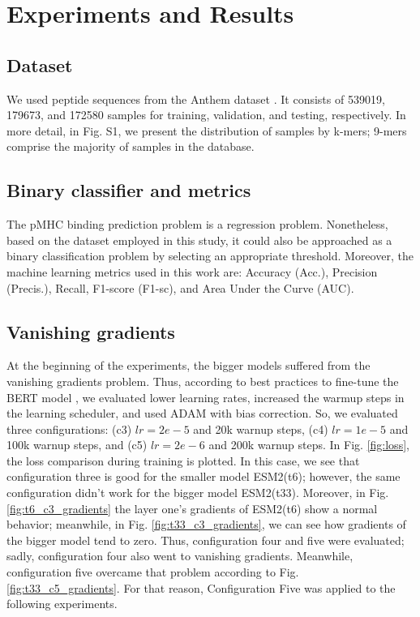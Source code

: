 \section{Experiments and Results}

\subsection{Dataset}
We used peptide sequences from the Anthem dataset \cite{mei2021anthem}. It consists of 539019, 179673, and 172580 samples for training, validation, and testing, respectively. In more detail, in Fig. S1, we present the distribution of samples by k-mers; 9-mers comprise the majority of samples in the database.

\subsection{Binary classifier and metrics}
The pMHC binding prediction problem is a regression problem. Nonetheless, based on the dataset employed in this study, it could also be approached as a binary classification problem by selecting an appropriate threshold. Moreover, the machine learning metrics used in this work are: Accuracy (Acc.), Precision (Precis.), Recall, F1-score (F1-sc), and Area Under the Curve (AUC).

\subsection{Vanishing gradients}
At the beginning of the experiments, the bigger models suffered from the vanishing gradients problem. Thus, according to best practices to fine-tune the BERT model \cite{mosbach2020stability}, we evaluated lower learning rates, increased the warmup steps in the learning scheduler, and used ADAM with bias correction. So, we evaluated three configurations: (c3) $lr=2e-5$ and 20k warnup steps, (c4) $lr=1e-5$ and 100k warnup steps, and (c5) $lr=2e-6$ and 200k warnup steps. In Fig. \ref{fig:loss}, the loss comparison during training is plotted. In this case, we see that configuration three is good for the smaller model ESM2(t6); however, the same configuration didn't work for the bigger model ESM2(t33). Moreover, in Fig. \ref{fig:t6_c3_gradients} the layer one's gradients of ESM2(t6) show a normal behavior; meanwhile, in Fig. \ref{fig:t33_c3_gradients}, we can see how gradients of the bigger model tend to zero. Thus, configuration four and five were evaluated; sadly, configuration four also went to vanishing gradients. Meanwhile, configuration five overcame that problem according to Fig. \ref{fig:t33_c5_gradients}. For that reason, Configuration Five was applied to the following experiments.


